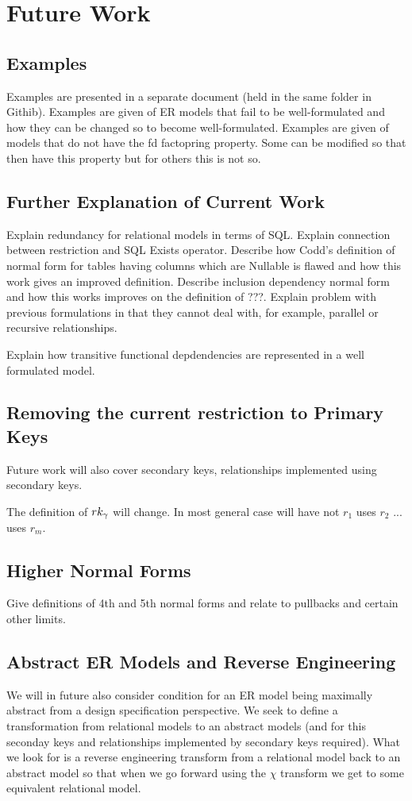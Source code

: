 \newpage
\section{Future Work}

\subsection{Examples}
Examples are presented in a separate document (held in the same folder in Githib). Examples are given of ER models that fail to be well-formulated and how they can be changed so to become well-formulated.  Examples are given of models that do not have the fd factopring property. Some can be modified 
so that then have this property but for others this is not so. 
\subsection{Further Explanation of Current Work}
Explain redundancy for relational models in terms of SQL. 
Explain connection between restriction and SQL Exists operator.
Describe how Codd's definition of normal form for tables having columns which are Nullable is flawed and how this work gives an improved definition. 
Describe inclusion dependency normal form and how this works improves on the definition of ???. Explain problem with previous formulations
in that they cannot deal with, for example, parallel or recursive relationships. 

Explain how transitive functional depdendencies are represented in a well formulated model. 

\subsection{Removing the current restriction to Primary Keys}
Future work will also cover secondary keys, relationships implemented using secondary keys.
\begin{noteforfuture}
The definition of $rk_\gamma$ will change.
In most general case  will have not $r_1$ uses $r_2$ ... uses $r_m$.
\end{noteforfuture}

\subsection{Higher Normal Forms}
Give definitions of 4th and 5th normal forms and relate to pullbacks and certain other limits.  

\subsection {Abstract ER Models and Reverse Engineering}
We will in future also consider condition for an ER model being maximally abstract from a design specification perspective. We seek to define a transformation from relational models to an abstract models (and for this seconday keys and relationships implemented by secondary keys required). What we look for is a reverse engineering transform from a relational model back to an abstract model so that when we go forward using the $\chi$ transform we get to some equivalent relational model.

